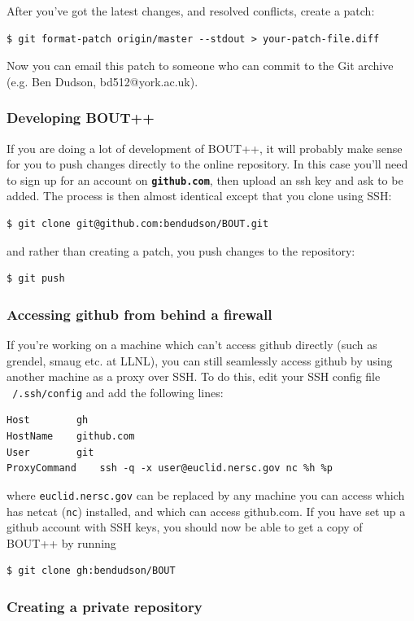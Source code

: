 \documentclass[12pt]{article}
\newcommand{\file}[1]{\texttt{\bf #1}}
\begin{document}
After you've got the latest changes, and resolved conflicts, create
a patch:
\begin{verbatim}
$ git format-patch origin/master --stdout > your-patch-file.diff
\end{verbatim}
Now you can email this patch to someone who can commit to the Git archive
(e.g. Ben Dudson, bd512@york.ac.uk).

\subsubsection{Developing BOUT++}

If you are doing a lot of development of BOUT++, it will probably make sense
for you to push changes directly to the online repository. 
In this case you'll need to sign up for an account on \file{github.com},
then upload an ssh key and ask to be added. The process is
then almost identical except that you clone using SSH:
\begin{verbatim}
$ git clone git@github.com:bendudson/BOUT.git
\end{verbatim}
and rather than creating a patch, you push changes to the repository:
\begin{verbatim}
$ git push
\end{verbatim}

\subsubsection{Accessing github from behind a firewall}

If you're working on a machine which can't access github directly
(such as grendel, smaug etc. at LLNL), you can still seamlessly access
github by using another machine as a proxy over SSH. To do this,
edit your SSH config file \texttt{~/.ssh/config} and add the following lines:
\begin{verbatim}
Host        gh
HostName    github.com
User        git
ProxyCommand    ssh -q -x user@euclid.nersc.gov nc %h %p
\end{verbatim}
where \texttt{euclid.nersc.gov} can be replaced by any machine you can access
which has netcat (\texttt{nc}) installed, and which can access github.com. 
If you have set up a github account with SSH keys, you should now be able to
get a copy of BOUT++ by running
\begin{verbatim}
$ git clone gh:bendudson/BOUT
\end{verbatim}

\subsubsection{Creating a private repository}
\end{document}
